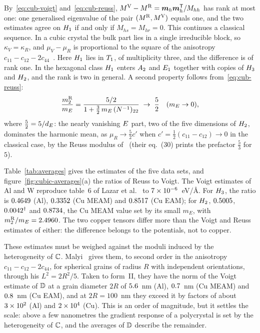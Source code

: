By~\eqref{eq:cub-voigt} and~\eqref{eq:cub-reuss},
$M^{\mathrm{V}}-M^{\mathrm{R}}=\bm m_h\bm m_h^{\mathsf T}/M_{hh}$ has rank at most one: one generalised
eigenvalue of the pair $(M^{\mathrm{R}},M^{\mathrm{V}})$ equals one, and the two estimates agree on
$H_{1}$ if and only if $M_{hs}=M_{hr}=0$. This continues a classical sequence. In a cubic
crystal the bulk part lies in a single irreducible block, so $\kappa_V=\kappa_R$, and
$\mu_V-\mu_R$ is proportional to the square of the anisotropy $c_{11}-c_{12}-2c_{44}$~\cite[eqs.~(27)
and~(28)]{Kube2016}. Here $H_{1}$ lies in $T_1$, of multiplicity three, and the
difference is of rank one. In the hexagonal class $H_{1}$ enters $A_2$ and $E_1$
together with copies of $H_{3}$ and $H_{2}$, and the rank is two in general. A second
property follows from~\eqref{eq:cub-reuss}:
\begin{equation}
\frac{m_2^{\mathrm{R}}}{m_E}=\frac{5/2}{1+\tfrac32\,m_E\,(N^{-1})_{22}}\;\to\;\frac52
\quad(m_E\to0),\label{eq:reuss-factor}
\end{equation}
where $\tfrac52=5/d_{E}$: the nearly vanishing $E$ part, two of the five
dimensions of $H_{2}$, dominates the harmonic mean, as $\mu_R\to\tfrac52c'$ when
$c'=\tfrac12(c_{11}-c_{12})\to0$ in the classical case, by the Reuss modulus
of~\cite[eq.~(28)]{Kube2016} (their eq.~(30) prints the prefactor $\tfrac53$ for $5$).

Table~\ref{tab:averages} gives the estimates of the five data sets, and
figure~\ref{fig:cubic-averages}(a) the ratios of Reuss to Voigt. The Voigt estimates of Al
and W reproduce table~6 of Lazar et al.~\cite{Lazar2022} to $7\times10^{-6}$~eV/\AA.
For $H_{3}$, the ratio is $0.4649$ (Al), $0.3352$ (Cu MEAM) and
$0.8517$ (Cu EAM); for $H_{2}$, $0.5005$, $0.0042^{\dagger}$ and
$0.8734$, the Cu MEAM value set by its small $m_E$, with
$m_2^{\mathrm{R}}/m_E=2.4960$. The two copper tensors differ more than the Voigt and
Reuss estimates of either: the difference belongs to the potentials, not to copper.

These estimates must be weighed against the moduli induced by the heterogeneity of
$\mathbb{C}$. Malyi~\cite[eqs.~(10.21) and (10.22)]{Malyi2021} gives them, to second order in the
anisotropy $c_{11}-c_{12}-2c_{44}$, for spherical grains of radius $R$ with independent
orientations, through his $L^2=2R^2/5$. Taken to form~II, they have the norm of the Voigt
estimate of $\mathbb{D}$ at a grain diameter $2R$ of $5.6$~nm (Al),
$0.7$~nm (Cu MEAM) and $0.8$~nm (Cu
EAM), and at $2R=100$~nm they exceed it by factors of about
$3\times10^{2}$ (Al) and $2\times10^{4}$ (Cu). This is an order of
magnitude, but it settles the scale: above a few nanometres the gradient response of a
polycrystal is set by the heterogeneity of $\mathbb{C}$, and the averages of $\mathbb{D}$ describe
the remainder.

